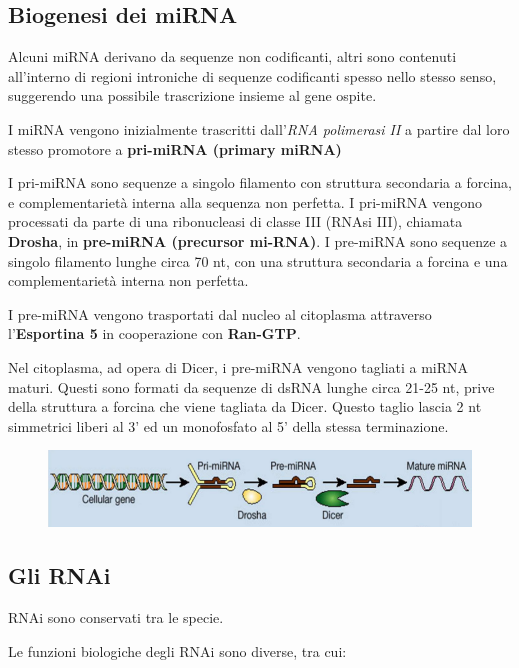 \documentclass[]{article}
\begin{document}
\subsection{Biogenesi dei miRNA}\label{biogenesi-dei-mirna}

Alcuni miRNA derivano da sequenze non codificanti, altri sono contenuti
all'interno di regioni introniche di sequenze codificanti spesso nello
stesso senso, suggerendo una possibile trascrizione insieme al gene
ospite.

I miRNA vengono inizialmente trascritti dall'\emph{RNA polimerasi II} a
partire dal loro stesso promotore a \textbf{pri-miRNA (primary miRNA)}

I pri-miRNA sono sequenze a singolo filamento con struttura secondaria a
forcina, e complementarietà interna alla sequenza non perfetta. I
pri-miRNA vengono processati da parte di una ribonucleasi di classe III
(RNAsi III), chiamata \textbf{Drosha}, in \textbf{pre-miRNA (precursor
mi-RNA)}. I pre-miRNA sono sequenze a singolo filamento lunghe circa 70
nt, con una struttura secondaria a forcina e una complementarietà
interna non perfetta.

I pre-miRNA vengono trasportati dal nucleo al citoplasma attraverso
l'\textbf{Esportina 5} in cooperazione con \textbf{Ran-GTP}.

Nel citoplasma, ad opera di Dicer, i pre-miRNA vengono tagliati a miRNA
maturi. Questi sono formati da sequenze di dsRNA lunghe circa 21-25 nt,
prive della struttura a forcina che viene tagliata da Dicer. Questo
taglio lascia 2 nt simmetrici liberi al 3' ed un monofosfato al 5' della
stessa terminazione.


\begin{figure}[htp]
\centering
\includegraphics[scale=1.00]{img/67_miRNA.png}
\caption{}
\label{mirna}
\end{figure}

\subsection{Gli RNAi}\label{gli-rnai}

RNAi sono conservati tra le specie.

Le funzioni biologiche degli RNAi sono diverse, tra cui:
\end{document}
